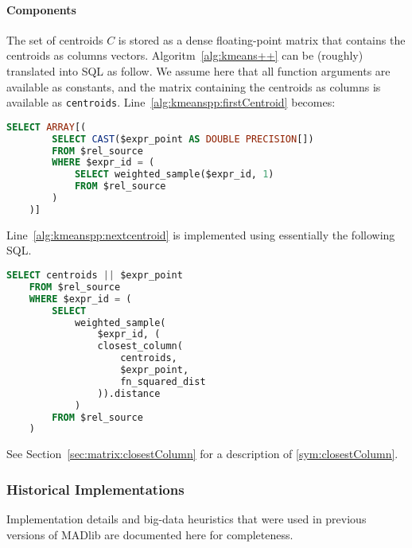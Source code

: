 \paragraph{Components} The set of centroids $C$ is stored as a dense floating-point matrix that contains the centroids as columns vectors. Algoritm~\ref{alg:kmeans++} can be (roughly) translated into SQL as follow. We assume here that all function arguments are available as constants, and the matrix containing the centroids as columns is available as \texttt{centroids}. Line~\ref{alg:kmeanspp:firstCentroid} becomes:
\begin{lstlisting}[language=SQL,gobble=4]
    SELECT ARRAY[(
        SELECT CAST($expr_point AS DOUBLE PRECISION[])
        FROM $rel_source
        WHERE $expr_id = (
            SELECT weighted_sample($expr_id, 1)
            FROM $rel_source
        )
    )]
\end{lstlisting}
Line~\ref{alg:kmeanspp:nextcentroid} is implemented using essentially the following SQL.
\begin{lstlisting}[language=SQL,gobble=4]
    SELECT centroids || $expr_point
    FROM $rel_source
    WHERE $expr_id = (
        SELECT
            weighted_sample(
                $expr_id, (
                closest_column(
                    centroids,
                    $expr_point,
                    fn_squared_dist
                )).distance
            )
        FROM $rel_source
    )
\end{lstlisting}
See Section~\ref{sec:matrix:closestColumn} for a description of \ref{sym:closestColumn}.

\subsubsection{Historical Implementations}

Implementation details and big-data heuristics that were used in previous versions of MADlib are documented here for completeness.

